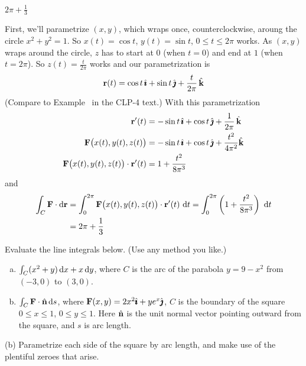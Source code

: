 \begin{answer} 
$2\pi+\frac{1}{3}$
\end{answer}

\begin{solution} First, we'll parametrize $(x,y)$, which wraps once, 
counterclockwise, aroung the circle $x^2+y^2=1$. So
$x(t) = \cos t$, $y(t) = \sin t$, $0\le t\le 2\pi$ works. As $(x,y)$ wraps
around the circle, $z$ has to start at $0$ (when $t=0$) and end at $1$
(when $t=2\pi$). 
So $z(t) =\frac{t}{2\pi}$ works and our parametrization 
is
\begin{equation*}
\mathbf{r}(t) = \cos t\,\hat{\pmb{\imath}} +\sin t\,\hat{\pmb{\jmath}} +\frac{t}{2\pi}\,\hat{\mathbf{k}}
\end{equation*}
(Compare to Example~ in the CLP-4 text.)
With this parametrization
\begin{align*}
\mathbf{r}'(t) &= -\sin t\,\hat{\pmb{\imath}} +\cos t\,\hat{\pmb{\jmath}} +\frac{1}{2\pi}\,\hat{\mathbf{k}} \\
\mathbf{F}\big(x(t),y(t),z(t)\big)& = -\sin t\,\hat{\pmb{\imath}} + \cos t\,\hat{\pmb{\jmath}}
                                         + \frac{t^2}{4\pi^2} \hat{\mathbf{k}} \\
\mathbf{F}\big(x(t),y(t),z(t)\big)\cdot\mathbf{r}'(t)& = 1 + \frac{t^2}{8\pi^3} 
\end{align*}
and
\begin{align*}
\int_C \mathbf{F}\cdot\mathrm{d}\mathbf{r}
&= \int_0^{2\pi} \mathbf{F}\big(x(t),y(t),z(t)\big)\cdot\mathbf{r}'(t)\ \mathrm{d}t
= \int_0^{2\pi}\left(1 + \frac{t^2}{8\pi^3} \right)\ \mathrm{d}t \\
&=2\pi+\frac{1}{3}
\end{align*}

\end{solution}


\begin{question}[M317 2011D] %
Evaluate the line integrals below. (Use any method you like.)
\begin{enumerate}[(a)]
\item
$\int_C (x^2 + y)\,\mathrm{d}x + x\,\mathrm{d}y$, where $C$ is the arc of the parabola 
$y = 9 - x^2$ from $(-3, 0)$ to $(3, 0)$.
\item
$\int_C \mathbf{F} \cdot\hat{\mathbf{n}}\, \mathrm{d}s$, where $\mathbf{F}(x, y) = 2x^2\hat{\pmb{\imath}} + ye^x\hat{\pmb{\jmath}}$, 
$C$ is the boundary of the square $0 \le x \le 1$, $0 \le y \le 1$. Here
$\hat{\mathbf{n}}$ is the unit normal vector pointing outward from the square, and $s$ is arc length.
\end{enumerate}
\end{question}

\begin{hint} 
(b) Parametrize each side of the square by arc length, and make use of the plentiful zeroes that arise.
\end{hint}

